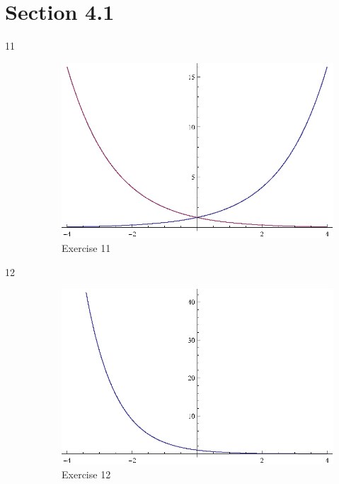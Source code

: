 \documentclass{exam}
\begin{document}
    \section{Section 4.1}

    \begin{description}

      \item[11] 
        \begin{figure}[H]
          \centering
          \includegraphics[scale=1.0]{exercise11.eps}
          \caption*{Exercise 11}
        \end{figure}

      \item[12] 
        \begin{figure}[H]
          \centering
          \includegraphics[scale=1.0]{exercise12.eps}
          \caption*{Exercise 12}
        \end{figure}


\end{description}
\end{document}
